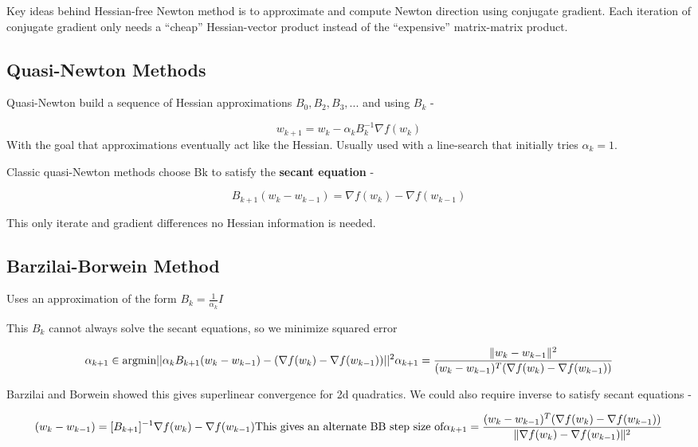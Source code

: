 \documentclass[
]{article}
\begin{document}
Key ideas behind Hessian-free Newton method is to approximate and compute Newton direction using conjugate gradient. Each iteration of conjugate gradient only needs a ``cheap'' Hessian-vector product instead of the ``expensive'' matrix-matrix product.

\subsection{Quasi-Newton Methods}\label{quasi-newton-methods}

Quasi-Newton build a sequence of Hessian approximations \(B_0, B_2, B_3, ...\) and using \(B_k\) -

\[
w_{k+1} = w_k - \alpha_k B_k^{-1} \nabla f(w_k)
\]
With the goal that approximations eventually act like the Hessian. Usually used with a line-search that initially tries \(\alpha_k = 1\).

Classic quasi-Newton methods choose Bk to satisfy the \textbf{secant equation} -

\[
B_{k+1} (w_k - w_{k-1}) = \nabla f(w_k) - \nabla f(w_{k-1})
\]

This only iterate and gradient differences no Hessian information is needed.

\subsection{Barzilai-Borwein Method}\label{barzilai-borwein-method}

Uses an approximation of the form \(B_k = \frac{1}{\alpha_k} I\)

This \(B_k\) cannot always solve the secant equations, so we minimize squared error

\[
\alpha_{k+1} \in \text{argmin} ||\alpha_k B_{k+1} (w_k - w_{k-1}) - (\nabla f(w_k) - \nabla f(w_{k-1})) ||^2 \\
\alpha_{k+1} = \frac{\|w_k - w_{k-1}\|^2}{(w_k - w_{k-1})^T (\nabla f(w_k) - \nabla f(w_{k-1}))}
\]

Barzilai and Borwein showed this gives superlinear convergence for 2d quadratics. We could also require inverse to satisfy secant equations -

\[
(w_k - w_{k-1}) = [B_{k+1}]^{-1} \nabla f(w_k) - \nabla f(w_{k-1}) \\
\text{This gives an alternate BB step size of} \\
\alpha_{k+1} = \frac{(w_k - w_{k-1})^T (\nabla f(w_k) - \nabla f(w_{k-1}))}{\|\nabla f(w_k) - \nabla f(w_{k-1})\|^2}
\]
\end{document}
